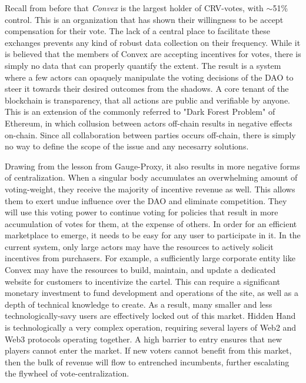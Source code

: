 \documentclass{article}
\begin{document}
Recall from before that \emph{Convex} is the largest holder of CRV-votes, with $\mathtt{\sim}$51\% control. This is an organization that has shown their willingness to be accept compensation for their vote. The lack of a central place to facilitate these exchanges prevents any kind of robust data collection on their frequency. While it is believed that the members of Convex are accepting incentives for votes, there is simply no data that can properly quantify the extent. The result is a system where a few actors can opaquely manipulate the voting decisions of the DAO to steer it towards their desired outcomes from the shadows. A core tenant of the blockchain is transparency, that all actions are public and verifiable by anyone. This is an extension of the commonly referred to "Dark Forest Problem" of Ethereum, in which collusion between actors off-chain results in negative effects on-chain. Since all collaboration between parties occurs off-chain, there is simply no way to define the scope of the issue and any necesarry solutions. 

Drawing from the lesson from Gauge-Proxy, it also results in more negative forms of centralization. When a singular body accumulates an overwhelming amount of voting-weight, they receive the majority of incentive revenue as well. This allows them to exert undue influence over the DAO and eliminate competition. They will use this voting power to continue voting for policies that result in more accumulation of votes for them, at the expense of others. In order for an efficient marketplace to emerge, it needs to be easy for any user to participate in it. In the current system, only large actors may have the resources to actively solicit incentives from purchasers. For example, a sufficiently large corporate entity like Convex may have the resources to build, maintain, and update a dedicated website for customers to incentivize the cartel. This can require a significant monetary investment to fund development and operations of the site, as well as a depth of technical knowledge to create. As a result, many smaller and less technologically-savy users are effectively locked out of this market. Hidden Hand is technologically a very complex operation, requiring several layers of Web2 and Web3 protocols operating together. A high barrier to entry ensures that new players cannot enter the market. If new voters cannot benefit from this market, then the bulk of revenue will flow to entrenched incumbents, further escalating the flywheel of vote-centralization.
\end{document}
